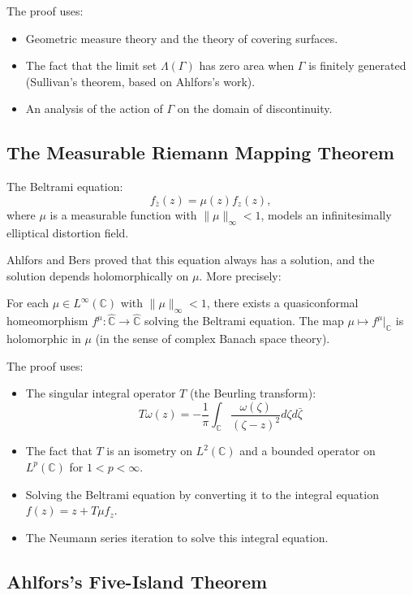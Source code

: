 The proof uses:
\begin{itemize}
    \item Geometric measure theory and the theory of covering surfaces.
    \item The fact that the limit set $\Lambda(\Gamma)$ has zero area when $\Gamma$ is finitely generated (Sullivan's theorem, based on Ahlfors's work).
    \item An analysis of the action of $\Gamma$ on the domain of discontinuity.
\end{itemize}

\subsection{The Measurable Riemann Mapping Theorem}

The Beltrami equation:
\[
f_{\bar z}(z) = \mu(z) f_z(z),
\]
where $\mu$ is a measurable function with $\|\mu\|_\infty < 1$, models an infinitesimally elliptical distortion field.

Ahlfors and Bers proved that this equation always has a solution, and the solution depends holomorphically on $\mu$. More precisely:

\begin{theorem}
For each $\mu \in L^\infty(\mathbb{C})$ with $\|\mu\|_\infty < 1$, there exists a quasiconformal homeomorphism $f^\mu: \widehat{\mathbb{C}} \to \widehat{\mathbb{C}}$ solving the Beltrami equation. The map $\mu \mapsto f^\mu|_{\mathbb{C}}$ is holomorphic in $\mu$ (in the sense of complex Banach space theory).
\end{theorem}

The proof uses:
\begin{itemize}
    \item The singular integral operator $T$ (the Beurling transform):
    \[
    T\omega(z) = -\frac{1}{\pi} \int_{\mathbb{C}} \frac{\omega(\zeta)}{(\zeta - z)^2} d\zeta d\bar\zeta
    \]
    \item The fact that $T$ is an isometry on $L^2(\mathbb{C})$ and a bounded operator on $L^p(\mathbb{C})$ for $1 < p < \infty$.
    \item Solving the Beltrami equation by converting it to the integral equation $f(z) = z + T\mu f_z$.
    \item The Neumann series iteration to solve this integral equation.
\end{itemize}

\subsection{Ahlfors's Five-Island Theorem}

